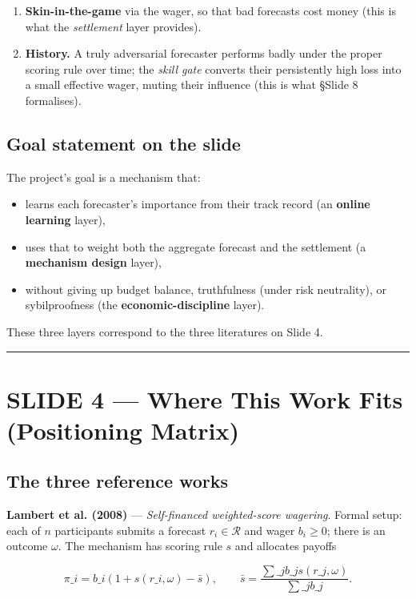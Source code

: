 \documentclass[11pt]{article}
\begin{document}
\begin{enumerate}
\item \textbf{Skin-in-the-game} via the wager, so that bad forecasts cost money (this is what the \emph{settlement} layer provides).
\item \textbf{History.} A truly adversarial forecaster performs badly under the proper scoring rule over time; the \emph{skill gate} converts their persistently high loss into a small effective wager, muting their influence (this is what \S Slide 8 formalises).
\end{enumerate}

\subsection{Goal statement on the slide}


The project's goal is a mechanism that:
\begin{itemize}
\item learns each forecaster's importance from their track record (an \textbf{online learning} layer),
\item uses that to weight both the aggregate forecast and the settlement (a \textbf{mechanism design} layer),
\item without giving up budget balance, truthfulness (under risk neutrality), or sybilproofness (the \textbf{economic-discipline} layer).
\end{itemize}

These three layers correspond to the three literatures on Slide 4.

\bigskip\hrule\bigskip

\section{SLIDE 4 --- Where This Work Fits (Positioning Matrix)}


\subsection{The three reference works}


\textbf{Lambert et al. (2008)} --- \emph{Self-financed weighted-score wagering}.
Formal setup: each of $n$ participants submits a forecast $r_i \in \mathcal R$ and wager $b_i \ge 0$; there is an outcome $\omega$. The mechanism has scoring rule $s$ and allocates payoffs

$$
\pi\_i = b\_i \left( 1 + s(r\_i, \omega) - \bar s \right), \qquad \bar s = \frac{\sum\_j b\_j s(r\_j, \omega)}{\sum\_j b\_j}.
$$
\end{document}
